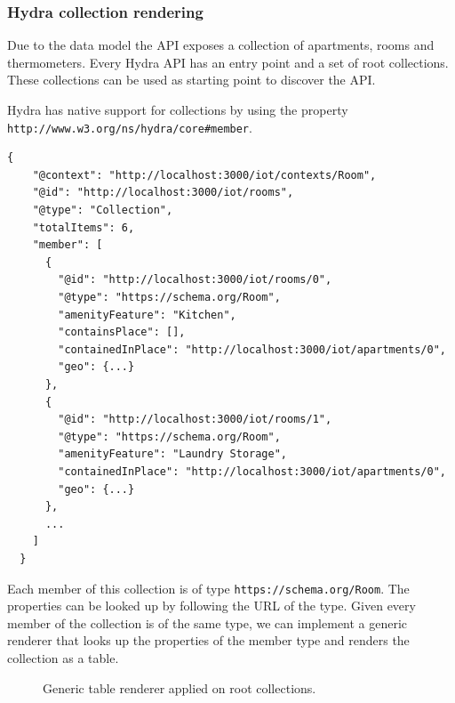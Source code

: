 \subsubsection{Hydra collection rendering}
Due to the data model the API exposes a collection of apartments, rooms and thermometers. Every Hydra API has an entry point and a set of root collections. These collections can be used as starting point to discover the API.

Hydra has native support for collections by using the property \lstinline{http://www.w3.org/ns/hydra/core#member}.

\lstset{language=JSON}
\begin{lstlisting}[caption=Data of /rooms as Hydra collection.]
  {
    "@context": "http://localhost:3000/iot/contexts/Room",
    "@id": "http://localhost:3000/iot/rooms",
    "@type": "Collection",
    "totalItems": 6,
    "member": [
      {
        "@id": "http://localhost:3000/iot/rooms/0",
        "@type": "https://schema.org/Room",
        "amenityFeature": "Kitchen",
        "containsPlace": [],
        "containedInPlace": "http://localhost:3000/iot/apartments/0",
        "geo": {...}
      },
      {
        "@id": "http://localhost:3000/iot/rooms/1",
        "@type": "https://schema.org/Room",
        "amenityFeature": "Laundry Storage",
        "containedInPlace": "http://localhost:3000/iot/apartments/0",
        "geo": {...}
      },
      ...
    ]
  }
\end{lstlisting}

Each member of this collection is of type \lstinline{https://schema.org/Room}. The properties can be looked up by following the URL of the type. Given every member of the collection is of the same type, we can implement a generic renderer that looks up the properties of the member type and renders the collection as a table.

\begin{figure}[!htb]
  \caption{Generic table renderer applied on root collections.}
\end{figure}


